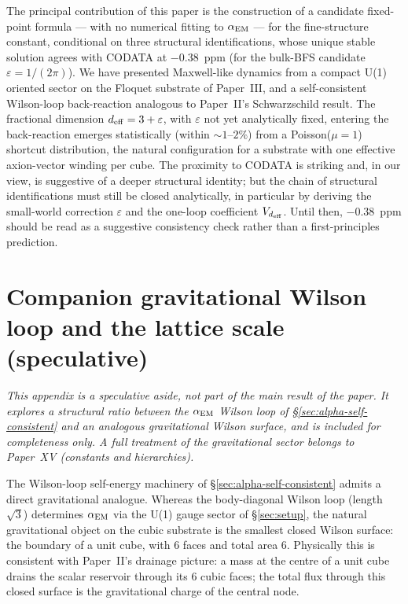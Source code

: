 \documentclass[11pt,a4paper]{article}
\begin{document}
The principal contribution of this paper is the construction
of a candidate fixed-point formula --- with no numerical
fitting to $\alpha_{\rm EM}$ --- for the
fine-structure constant, conditional on three structural
identifications, whose unique stable solution agrees with
CODATA at $-0.38$~ppm (for the bulk-BFS candidate
$\varepsilon = 1/(2\pi)$). We have presented Maxwell-like
dynamics from a compact U(1) oriented sector on the Floquet
substrate of Paper~III, and a self-consistent Wilson-loop
back-reaction analogous to Paper~II's Schwarzschild result.
The fractional dimension $d_{\rm eff} = 3 + \varepsilon$, with $\varepsilon$ not yet analytically fixed, entering
the back-reaction emerges statistically (within $\sim 1\text{--}2\%$)
from a Poisson($\mu = 1$) shortcut distribution, the natural
configuration for a substrate with one effective axion-vector
winding per cube. The proximity to CODATA is striking and, in
our view, is suggestive of a deeper structural identity; but
the chain of structural identifications must still be closed
analytically, in particular by deriving the small-world
correction $\varepsilon$ and the one-loop coefficient
$V_{d_{\rm eff}}$. Until then, $-0.38$~ppm should be read as a
suggestive consistency check rather than a first-principles
prediction.


\appendix
\section{Companion gravitational Wilson loop and the lattice scale (speculative)}
\label{sec:grav-companion}

\textit{This appendix is a speculative aside, not part of the main
result of the paper. It explores a structural ratio between the
$\alpha_{\rm EM}$ Wilson loop of \S\ref{sec:alpha-self-consistent}
and an analogous gravitational Wilson surface, and is included for
completeness only. A full treatment of the gravitational sector
belongs to Paper~XV (constants and hierarchies).}

The Wilson-loop self-energy machinery of
\S\ref{sec:alpha-self-consistent} admits a direct gravitational
analogue. Whereas the body-diagonal Wilson loop (length
$\sqrt{3}$) determines $\alpha_{\rm EM}$ via the U(1) gauge
sector of \S\ref{sec:setup}, the natural gravitational object
on the cubic substrate is the smallest closed Wilson surface:
the boundary of a unit cube, with $6$ faces and total area $6$.
Physically this is consistent with Paper~II's drainage picture:
a mass at the centre of a unit cube drains the scalar reservoir
through its $6$ cubic faces; the total flux through this closed
surface is the gravitational charge of the central node.
\end{document}
